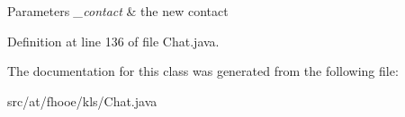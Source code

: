 \begin{DoxyParams}{Parameters}
{\em \-\_\-contact} & the new contact \\
\hline
\end{DoxyParams}


Definition at line 136 of file Chat.\-java.



The documentation for this class was generated from the following file\-:\begin{DoxyCompactItemize}
\item 
src/at/fhooe/kls/Chat.\-java\end{DoxyCompactItemize}
